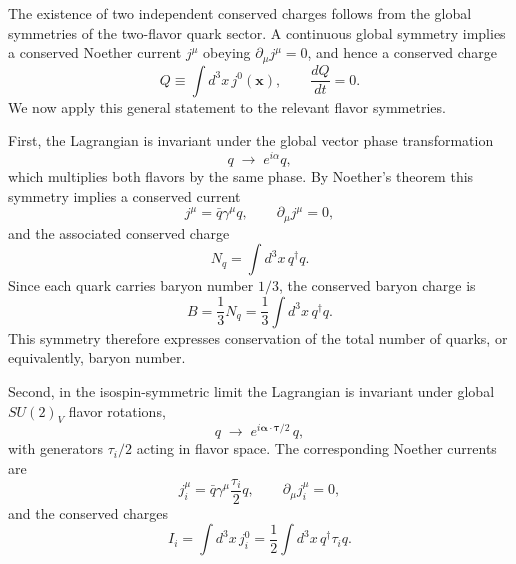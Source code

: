 The existence of two independent conserved charges follows from the
global symmetries of the two-flavor quark sector.
A continuous global symmetry implies a conserved Noether current
$j^\mu$ obeying $\partial_\mu j^\mu=0$, and hence a conserved charge
\cite{WeinbergQFT,PeskinSchroeder1995}
\begin{equation}
Q \equiv \int d^3x\, j^0(\mathbf{x}),
\qquad
\frac{dQ}{dt}=0 .
\end{equation}
We now apply this general statement to the relevant flavor symmetries.

First, the Lagrangian is invariant under the global vector phase
transformation
\begin{equation}
q \;\longrightarrow\; e^{i\alpha} q ,
\end{equation}
which multiplies both flavors by the same phase.
By Noether's theorem this symmetry implies a conserved current
\begin{equation}
j^\mu = \bar q \gamma^\mu q,
\qquad
\partial_\mu j^\mu = 0 ,
\end{equation}
and the associated conserved charge
\begin{equation}
N_q = \int d^3x\, q^\dagger q .
\end{equation}
Since each quark carries baryon number $1/3$, the conserved baryon
charge is
\begin{equation}
B = \frac{1}{3} N_q
= \frac{1}{3}\int d^3x\, q^\dagger q .
\end{equation}
This symmetry therefore expresses conservation of the total number of
quarks, or equivalently, baryon number.

Second, in the isospin-symmetric limit the Lagrangian is invariant
under global $SU(2)_V$ flavor rotations,
\begin{equation}
q \;\longrightarrow\; e^{i\boldsymbol{\alpha}\cdot\boldsymbol{\tau}/2}\, q ,
\end{equation}
with generators $\tau_i/2$ acting in flavor space.
The corresponding Noether currents are
\begin{equation}
j_i^\mu = \bar q \gamma^\mu \frac{\tau_i}{2} q,
\qquad
\partial_\mu j_i^\mu = 0 ,
\end{equation}
and the conserved charges
\begin{equation}
I_i = \int d^3x\, j_i^0
= \frac{1}{2}\int d^3x\, q^\dagger \tau_i q .
\end{equation}

